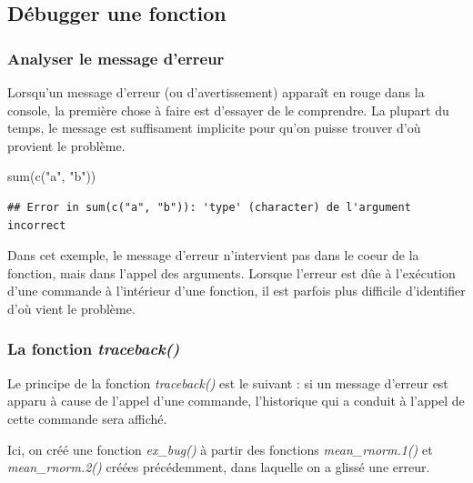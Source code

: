 \documentclass[
]{book}
\newenvironment{Shaded}{\begin{snugshade}}{\end{snugshade}}
\newcommand{\FunctionTok}[1]{\textcolor[rgb]{0.00,0.00,0.00}{#1}}
\newcommand{\NormalTok}[1]{#1}
\newcommand{\StringTok}[1]{\textcolor[rgb]{0.31,0.60,0.02}{#1}}
\theoremstyle{definition}
\theoremstyle{definition}
\theoremstyle{definition}
\theoremstyle{definition}
\theoremstyle{remark}
\begin{document}
\hypertarget{duxe9bugger-une-fonction}{%
\subsection{Débugger une fonction}\label{duxe9bugger-une-fonction}}

\hypertarget{analyser-le-message-derreur}{%
\subsubsection{Analyser le message d'erreur}\label{analyser-le-message-derreur}}

Lorsqu'un message d'erreur (ou d'avertissement) apparaît en rouge dans la console, la première chose à faire est d'essayer de le comprendre. La plupart du temps, le message est suffisament implicite pour qu'on puisse trouver d'où provient le problème.

\begin{Shaded}
\begin{Highlighting}[]
\FunctionTok{sum}\NormalTok{(}\FunctionTok{c}\NormalTok{(}\StringTok{"a"}\NormalTok{, }\StringTok{"b"}\NormalTok{))}
\end{Highlighting}
\end{Shaded}

\begin{verbatim}
## Error in sum(c("a", "b")): 'type' (character) de l'argument incorrect
\end{verbatim}

Dans cet exemple, le message d'erreur n'intervient pas dans le coeur de la fonction, mais dans l'appel des arguments. Lorsque l'erreur est dûe à l'exécution d'une commande à l'intérieur d'une fonction, il est parfois plus difficile d'identifier d'où vient le problème.

\hypertarget{la-fonction-traceback}{%
\subsubsection{\texorpdfstring{La fonction \emph{traceback()}}{La fonction traceback()}}\label{la-fonction-traceback}}

Le principe de la fonction \emph{traceback()} est le suivant : si un message d'erreur est apparu à cause de l'appel d'une commande, l'historique qui a conduit à l'appel de cette commande sera affiché.

Ici, on créé une fonction \emph{ex\_bug()} à partir des fonctions \emph{mean\_rnorm.1()} et \emph{mean\_rnorm.2()} créées précédemment, dans laquelle on a glissé une erreur.
\end{document}
